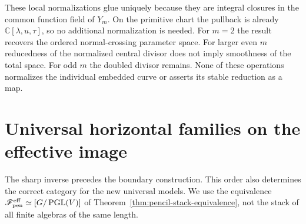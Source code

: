 \documentclass[11pt,reqno]{amsart}
\numberwithin{equation}{section}
\theoremstyle{definition}\newtheorem{definition}[theorem]{Definition}
\theoremstyle{remark}\newtheorem{remark}[theorem]{Remark}
\newcommand{\C}{\mathbb C}\newcommand{\Q}{\mathbb Q}
\begin{document}
These local normalizations glue uniquely because they are integral
closures in the common function field of $Y_m$. On the primitive
chart the pullback is already $\C[\lambda,u,\tau]$, so no additional
normalization is needed. For $m=2$ the result recovers the ordered
normal-crossing parameter space. For larger even $m$ reducedness of
the normalized central divisor does not imply smoothness of the
total space. For odd $m$ the doubled divisor remains. None of these
operations normalizes the individual embedded curve or asserts its
stable reduction as a map.

\section{Universal horizontal families on the effective image}
\label{sec:effective-horizontal-v166}
The sharp inverse precedes the boundary construction. This order
also determines the correct category for the new universal models.
We use the equivalence
$\mathscr F_{\rm pen}^{\rm eff}\simeq[G/\operatorname{PGL}(V)]$
of Theorem~\ref{thm:pencil-stack-equivalence}, not the stack of all
finite algebras of the same length.
\end{document}
